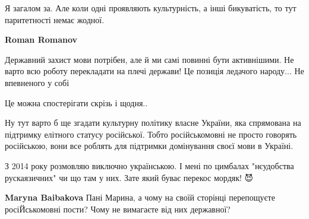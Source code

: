 \begin{itemize}
\begin{itemize}
Я загалом за. Але коли одні проявляють культурність, а інші бикуватість, то тут паритетності немає жодної.

 
\textbf{Roman Romanov} 

Державний захист мови потрібен, але й ми самі повинні бути активнішими. Не
варто всю роботу перекладати на плечі держави! Це позиція ледачого народу... Не
впевненого у собі
\end{itemize}

 
Це можна спостерігати скрізь і щодня..

 

Ну тут варто б ще згадати культурну політику власне України, яка спрямована на
підтримку елітного статусу російської. Тобто російськомовні не просто говорять
російською, вони все роблять для підтримки домінування своєї мови в Україні.


 

З 2014 року розмовляю виключно українською. І мені по цимбалах "нєудобства
рускаязичних" чи що там у них. Зате який буває перекос мордяк! 😈

\begin{itemize}
 
\textbf{Maryna Baibakova} Пані Марина, а чому на своїй сторінці перепощуєте росіЙськомовні пости? Чому не вимагаєте від них державної?


\end{itemize}
\end{itemize}

